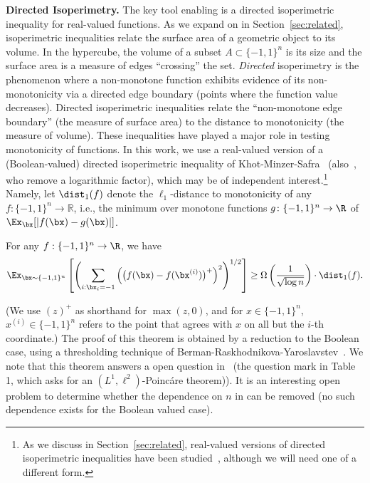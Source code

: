     \noindent\textbf{Directed Isoperimetry.} The key tool enabling  is a directed isoperimetric inequality for real-valued functions. As we expand on in Section~\ref{sec:related}, isoperimetric inequalities relate the surface area of a geometric object to its volume. In the hypercube, the volume of a subset $A \subset \{-1,1\}^n$ is its size and the surface area is a measure of edges ``crossing'' the set. \emph{Directed} isoperimetry is the phenomenon where a non-monotone function exhibits evidence of its non-monotonicity via a directed edge boundary (points where the function value decreases). Directed isoperimetric inequalities relate the ``non-monotone edge boundary'' (the measure of surface area) to the distance to monotonicity (the measure of volume). These inequalities have played a major role in testing monotonicity of functions. In this work, we use a real-valued version of a (Boolean-valued) directed isoperimetric inequality of Khot-Minzer-Safra~\cite{KMS18} (also~\cite{PRW22}, who remove a logarithmic factor), which may be of independent interest.\footnote{As we discuss in Section~\ref{sec:related}, real-valued versions of directed isoperimetric inequalities have been studied~\cite{BKR23}, although we will need one of a different form.} Namely, let $\dist_1(f)$ denote the $\ell_1$-distance to monotonicity of any 
    $f:\{-1,1\}^n\rightarrow \mathbb{R}$, i.e., the minimum over monotone functions $g \colon \{-1,1\}^n \to \R$ of $\Ex_{\bx}[|f(\bx) - g(\bx)|]$.
\begin{theorem}\label{thm:l1-talagrand}
	For any $f:\{-1,1\}^n \to \R$, we have
 \[
	\Ex_{\bx \sim \{-1,1\}^n}\left[  \left( \sum_{i:\bx_i=-1} \left(\big(f(\bx) - f(\bx^{(i)})\big)^+\right)^2 \right)^{1/2}  \right] \geq \Omega\left(\frac{1}{\sqrt{\log n}}\right)\cdot \dist_1(f).
	\]
\end{theorem}
(We use $(z)^+$ as shorthand for $\max(z,0)$, and for $x \in \{-1,1\}^n$, $x^{(i)} \in \{-1,1\}^n$ refers to the point that agrees with $x$ on all but the $i$-th coordinate.)
The proof of this theorem is obtained by a reduction to the Boolean case, using a thresholding technique of Berman-Raskhodnikova-Yaroslavstev~\cite{BeRaYa14}. 
We note that this theorem answers a open question in~\cite{F23} 
(the question mark in Table 1, which asks for an $(L^1, \ell^2)$-Poinc\'{a}re theorem)).
It is an interesting open problem to determine whether the dependence on $n$ in  can be removed (no such dependence exists for the Boolean valued case).


